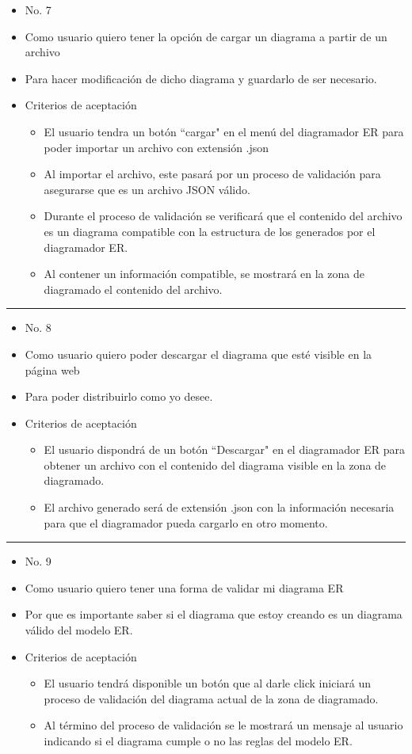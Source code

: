 \begin{itemize}
	\item No. 7
	\item Como usuario quiero tener la opción de cargar un diagrama a partir de un archivo
	\item Para hacer modificación de dicho diagrama y guardarlo de ser necesario.
	\item Criterios de aceptación
	\begin{itemize}
		\item El usuario tendra un botón ``cargar" en el menú del diagramador ER para poder importar un archivo con extensión .json
		\item Al importar el archivo, este pasará por un proceso de validación para asegurarse que es un archivo JSON válido.
		\item Durante el proceso de validación se verificará que el contenido del archivo es un diagrama compatible con la estructura de los generados por el diagramador ER.
		\item Al contener un información compatible, se mostrará en la zona de diagramado el contenido del archivo.
	\end{itemize}
\end{itemize}
\noindent\rule{\textwidth}{1pt}
\begin{itemize}
	\item No. 8
	\item Como usuario quiero poder descargar el diagrama que esté visible en la página web
	\item Para poder distribuirlo como yo desee.
	\item Criterios de aceptación
	\begin{itemize}
		\item El usuario dispondrá de un botón ``Descargar" en el diagramador ER para obtener un archivo con el contenido del diagrama visible en la zona de diagramado.
		\item El archivo generado será de extensión .json con la información necesaria para que el diagramador pueda cargarlo en otro momento.
	\end{itemize}
\end{itemize}
\noindent\rule{\textwidth}{1pt}
\begin{itemize}
	\item No. 9
	\item Como usuario quiero tener una forma de validar mi diagrama ER
	\item Por que es importante saber si el diagrama que estoy creando es un diagrama válido del modelo ER.
	\item Criterios de aceptación
	\begin{itemize}
		\item El usuario tendrá disponible un botón que al darle click iniciará un proceso de validación del diagrama actual de la zona de diagramado.
		\item Al término del proceso de validación se le mostrará un mensaje al usuario indicando si el diagrama cumple o no las reglas del modelo ER.
	\end{itemize}
\end{itemize}

